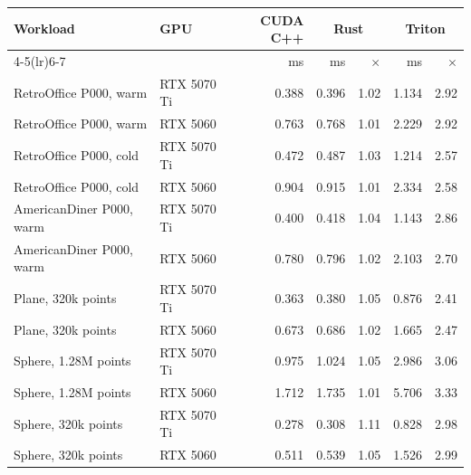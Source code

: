 \begin{tabular}{llrrrrr}
\toprule
Workload & GPU & CUDA C++ & \multicolumn{2}{c}{Rust} & \multicolumn{2}{c}{Triton} \\
\cmidrule(lr){4-5}\cmidrule(lr){6-7}
 & & ms & ms & $\times$ & ms & $\times$ \\
\midrule
RetroOffice P000, warm & RTX 5070 Ti & 0.388 & 0.396 & 1.02 & 1.134 & 2.92 \\
RetroOffice P000, warm & RTX 5060 & 0.763 & 0.768 & 1.01 & 2.229 & 2.92 \\
RetroOffice P000, cold & RTX 5070 Ti & 0.472 & 0.487 & 1.03 & 1.214 & 2.57 \\
RetroOffice P000, cold & RTX 5060 & 0.904 & 0.915 & 1.01 & 2.334 & 2.58 \\
AmericanDiner P000, warm & RTX 5070 Ti & 0.400 & 0.418 & 1.04 & 1.143 & 2.86 \\
AmericanDiner P000, warm & RTX 5060 & 0.780 & 0.796 & 1.02 & 2.103 & 2.70 \\
Plane, 320k points & RTX 5070 Ti & 0.363 & 0.380 & 1.05 & 0.876 & 2.41 \\
Plane, 320k points & RTX 5060 & 0.673 & 0.686 & 1.02 & 1.665 & 2.47 \\
Sphere, 1.28M points & RTX 5070 Ti & 0.975 & 1.024 & 1.05 & 2.986 & 3.06 \\
Sphere, 1.28M points & RTX 5060 & 1.712 & 1.735 & 1.01 & 5.706 & 3.33 \\
Sphere, 320k points & RTX 5070 Ti & 0.278 & 0.308 & 1.11 & 0.828 & 2.98 \\
Sphere, 320k points & RTX 5060 & 0.511 & 0.539 & 1.05 & 1.526 & 2.99 \\
\bottomrule
\end{tabular}
